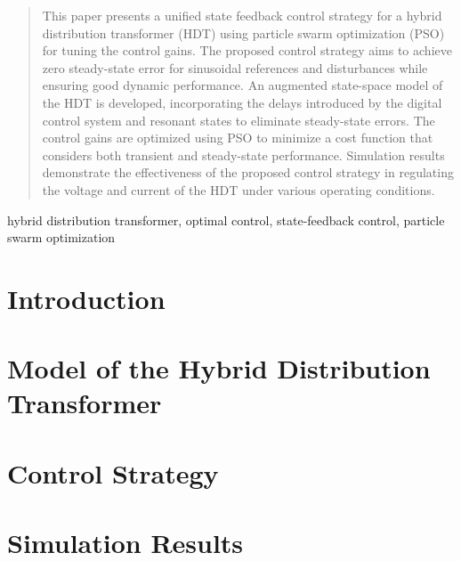 





\maketitle

\begin{abstract}
    This paper presents a unified state feedback control strategy for a hybrid distribution transformer (HDT) using particle swarm optimization (PSO) for tuning the control gains. The proposed control strategy aims to achieve zero steady-state error for sinusoidal references and disturbances while ensuring good dynamic performance. An augmented state-space model of the HDT is developed, incorporating the delays introduced by the digital control system and resonant states to eliminate steady-state errors. The control gains are optimized using PSO to minimize a cost function that considers both transient and steady-state performance. Simulation results demonstrate the effectiveness of the proposed control strategy in regulating the voltage and current of the HDT under various operating conditions.
\end{abstract}

\begin{IEEEkeywords}
    hybrid distribution transformer, optimal control, state-feedback control, particle swarm optimization
\end{IEEEkeywords}

\section{Introduction}



\section{Model of the Hybrid Distribution Transformer}



\section{Control Strategy}



\section{Simulation Results}

